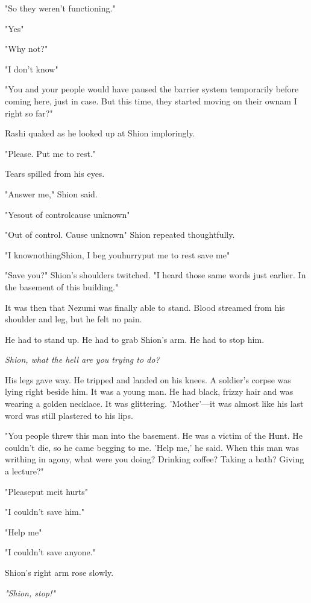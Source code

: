 "So they weren't functioning."

"\el Yes\el "

"Why not?"

"\el I don't know\el "

"You and your people would have paused the barrier system temporarily
before coming here, just in case. But this time, they started moving on
their own\el am I right so far?"

Rashi quaked as he looked up at Shion imploringly.

"\el Please. Put me to rest."

Tears spilled from his eyes.

"Answer me," Shion said.

"\el Yes\el out of control\el cause unknown\el "

"Out of control. Cause unknown\el " Shion repeated thoughtfully.

"I know\el nothing\el Shion, I beg you\el hurry\el put me to rest\el 
save me\el "

"Save you?" Shion's shoulders twitched. "I heard those same words just
earlier. In the basement of this building."

It was then that Nezumi was finally able to stand. Blood streamed from
his shoulder and leg, but he felt no pain.

He had to stand up. He had to grab Shion's arm. He had to stop him.

\emph{Shion, what the hell are you trying to do?}

His legs gave way. He tripped and landed on his knees. A soldier's
corpse was lying right beside him. It was a young man. He had black,
frizzy hair and was wearing a golden necklace. It was glittering.
'Mother'---it was almost like his last word was still plastered to his
lips.

"You people threw this man into the basement. He was a victim of the
Hunt. He couldn't die, so he came begging to me. 'Help me,' he said.
When this man was writhing in agony, what were you doing? Drinking
coffee? Taking a bath? Giving a lecture?"

"\el Please\el put me\el it hurts\el "

"I couldn't save him."

"\el Help me\el "

"I couldn't save anyone."

Shion's right arm rose slowly.

\emph{"Shion, stop!"}

